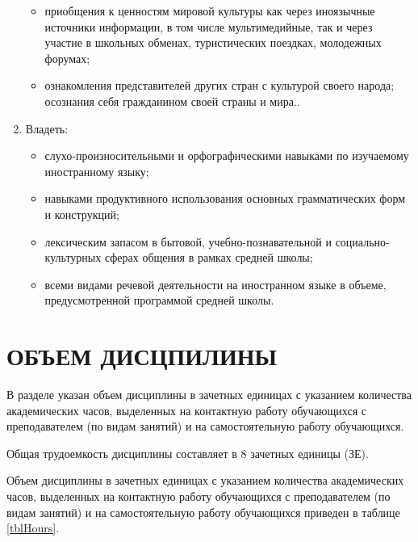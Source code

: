 \begin{enumerate}
\begin{itemize}
	\item приобщения к ценностям мировой культуры как через иноязычные источники информации, в том числе мультимедийные, так и через участие в школьных обменах, туристических поездках, молодежных форумах;
	\item ознакомления представителей других стран с культурой своего народа; осознания себя гражданином своей страны и мира..
	\end{itemize}
\item Владеть:
	\begin{itemize}
	\item слухо-произносительными и орфографическими навыками по изучаемому иностранному языку;
	\item навыками продуктивного использования основных грамматических форм и конструкций;
	\item лексическим запасом в бытовой, учебно-познавательной и социально-культурных сферах общения в рамках средней школы;
	\item всеми видами речевой деятельности на иностранном языке в объеме, предусмотренной программой средней школы.
	\end{itemize}
\end{enumerate}	

\chapter{ОБЪЕМ ДИСЦПИЛИНЫ}
\label{chapt3}

В разделе указан объем дисциплины в зачетных единицах с указанием количества академических часов, выделенных на контактную работу обучающихся с преподавателем (по видам занятий) и на самостоятельную работу обучающихся.

Общая трудоемкость дисциплины составляет в 8 зачетных единицы (ЗЕ).

Объем дисциплины в зачетных единицах с указанием количества академических часов, выделенных на контактную работу обучающихся с преподавателем (по видам занятий) и на самостоятельную работу обучающихся приведен в таблице \ref{tblHours}.

